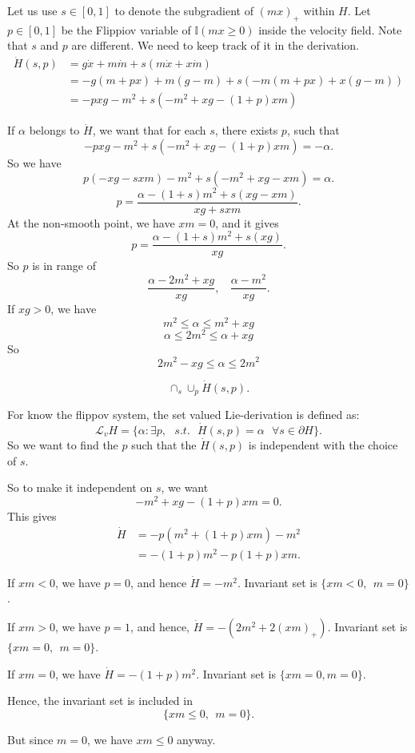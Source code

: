 \documentclass[letterpaper,11pt]{article}
\begin{document}
Let us use $s \in[0,1]$ to denote the subgradient of $(mx)_+$ within $H$. Let $p \in[0,1]$ be the Flippiov variable of $\mathbb{I}(mx \geq 0)$ inside the velocity field. Note that $s$ and $p$ are different. We need to keep track of it in the derivation. 
\begin{align*}
\dot H(s,p) &  =  g \dot x + m \dot m + s (m \dot x + x \dot m) \\ 
& = -g (m + p x) + m(g - m) + s (-m (m + p x) + x (g - m) )\\
& = - p x g - m^2 + s (- m^2 + xg - (1+p)xm)
\end{align*}

If $\alpha$ belongs to $\dot H$, we want that for each $s$, there exists $p$, such that 
$$
- p x g - m^2 + s (- m^2 + xg - (1+p)xm) = -\alpha.
$$
So we have 
$$
p (-xg - s x m ) - m^2 + s (-m^2 + xg - xm) = \alpha. 
$$
$$
p = \frac{\alpha -(1+s) m^2 + s (xg - xm)}{xg +  s xm}. 
$$
At the non-smooth point, we have $xm =0$, and it gives 
$$
p = \frac{\alpha -(1+s) m^2 + s (xg)}{xg}.  
$$
So $p$ is in range of 
$$
\frac{\alpha - 2m^2 + xg}{xg}, ~~~~ 
\frac{\alpha - m^2 }{xg}. 
$$
If $xg >0$, we have 
$$
m^2 \leq \alpha \leq m^2 + xg
$$
$$
\alpha \leq 2m^2 \leq \alpha + xg 
$$
So 
$$
2m^2  - xg \leq \alpha \leq 2 m^2
$$

$$\cap_{s} \cup_{p} \dot H(s, p).$$


For know the flippov system, the set valued Lie-derivation is defined as:
$$
\mathcal L_v H  =   
\{\alpha \colon \exists p, ~~~ s.t. ~~~ \dot H(s,p) = \alpha ~~~\forall s \in \partial H \}.
$$
So we want to find the $p$ such that the $\dot H(s,p)$ is independent with the choice of $s$. 

So to make it independent on $s$, we want 
$$
-m^2 + xg -(1+p)xm  = 0.
$$
This gives
\begin{align*}
\dot H 
& = -p(m^2 + (1+p) xm)- m^2 \\
& = -(1+p)m^2 - p(1+p) xm. 
\end{align*}

If $xm <0$, we have $p=0$, and hence $\dot H = - m^2$. 
Invariant set is $\{xm < 0, ~~ m=0\}$.

If $xm >0$, we have $p = 1$, and hence, $\dot H = -(2 m^2 + 2 (xm)_+)$. Invariant set is $\{xm=0, ~~ m=0\}.$

If $xm=0$, we have $\dot H = -(1+p) m^2$. Invariant set is $\{xm=0, m = 0\}$. 

Hence, the invariant set is included in 
$$
\{xm \leq 0, ~~ m = 0\}. 
$$

But since $m=0$, we have $xm\leq 0$ anyway. 
\end{document}
